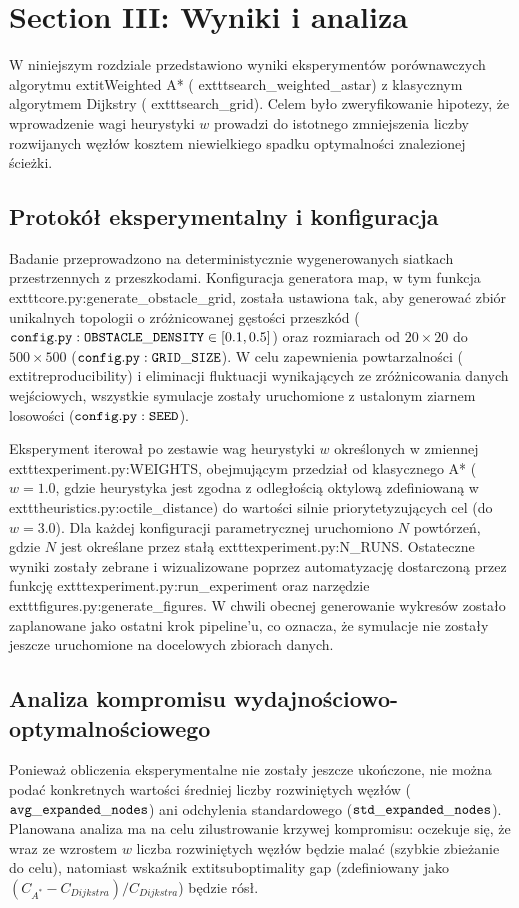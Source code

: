 \documentclass[conference]{IEEEtran}
\renewcommand{\texttt}[1]{\ifmmode\mathtt{#1}\else{\normalfont\ttfamily #1}\fi}
\begin{document}
\section{Section III: Wyniki i analiza}
W niniejszym rozdziale przedstawiono wyniki eksperymentów porównawczych algorytmu  extit{Weighted A*} ( exttt{search\_weighted\_astar}) z klasycznym algorytmem Dijkstry ( exttt{search\_grid}). Celem było zweryfikowanie hipotezy, że wprowadzenie wagi heurystyki $w$ prowadzi do istotnego zmniejszenia liczby rozwijanych węzłów kosztem niewielkiego spadku optymalności znalezionej ścieżki.

\subsection{Protokół eksperymentalny i konfiguracja}
Badanie przeprowadzono na deterministycznie wygenerowanych siatkach przestrzennych z przeszkodami. Konfiguracja generatora map, w tym funkcja  exttt{core.py:generate\_obstacle\_grid}, została ustawiona tak, aby generować zbiór unikalnych topologii o zróżnicowanej gęstości przeszkód ($\texttt{config.py:OBSTACLE\_DENSITY} \in [0.1, 0.5]$) oraz rozmiarach od $20\times20$ do $500\times500$ ($\texttt{config.py:GRID\_SIZE}$). W celu zapewnienia powtarzalności ( extit{reproducibility}) i eliminacji fluktuacji wynikających ze zróżnicowania danych wejściowych, wszystkie symulacje zostały uruchomione z ustalonym ziarnem losowości ($\texttt{config.py:SEED}$).

Eksperyment iterował po zestawie wag heurystyki $w$ określonych w zmiennej  exttt{experiment.py:WEIGHTS}, obejmującym przedział od klasycznego A* ($w=1.0$, gdzie heurystyka jest zgodna z odległością oktylową zdefiniowaną w  exttt{heuristics.py:octile\_distance}) do wartości silnie priorytetyzujących cel (do $w=3.0$). Dla każdej konfiguracji parametrycznej uruchomiono $N$ powtórzeń, gdzie $N$ jest określane przez stałą  exttt{experiment.py:N\_RUNS}. Ostateczne wyniki zostały zebrane i wizualizowane poprzez automatyzację dostarczoną przez funkcję  exttt{experiment.py:run\_experiment} oraz narzędzie  exttt{figures.py:generate\_figures}. W chwili obecnej generowanie wykresów zostało zaplanowane jako ostatni krok pipeline'u, co oznacza, że symulacje nie zostały jeszcze uruchomione na docelowych zbiorach danych.

\subsection{Analiza kompromisu wydajnościowo-optymalnościowego}
Ponieważ obliczenia eksperymentalne nie zostały jeszcze ukończone, nie można podać konkretnych wartości średniej liczby rozwiniętych węzłów ($\texttt{avg\_expanded\_nodes}$) ani odchylenia standardowego ($\texttt{std\_expanded\_nodes}$). Planowana analiza ma na celu zilustrowanie krzywej kompromisu: oczekuje się, że wraz ze wzrostem $w$ liczba rozwiniętych węzłów będzie malać (szybkie zbieżanie do celu), natomiast wskaźnik  extit{suboptimality gap} (zdefiniowany jako $(C_{A^*} - C_{Dijkstra}) / C_{Dijkstra}$) będzie rósł.
\end{document}

